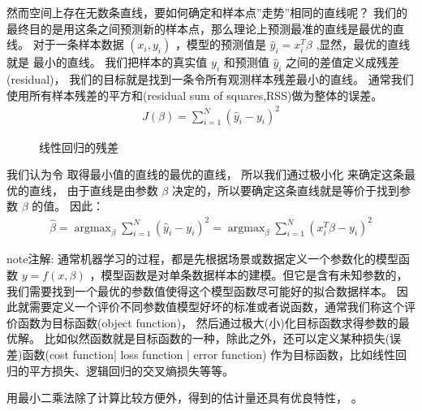 \documentclass[letterpaper,10pt,english]{sphinxmanual}
\begin{document}
然而空间上存在无数条直线，要如何确定和样本点”走势”相同的直线呢？
我们的最终目的是用这条之间预测新的样本点，那么理论上预测最准的直线是最优的直线。
对于一条样本数据 \((x_i,y_i)\) ，模型的预测值是 \(\hat{y}_i = x_i^T \beta\)
,显然，最优的直线就是  最小的直线。
我们把样本的真实值 \(y_i\) 和预测值 \(\hat{y}_i\) 之间的差值定义成残差(residual)，
我们的目标就是找到一条令所有观测样本残差最小的直线。
通常我们使用所有样本残差的平方和(residual sum of squares,RSS)做为整体的误差。
\begin{equation}\label{equation:线性回归/content:线性回归/content:1}
\begin{split}J(\beta)=\sum_{i=1}^N (\hat{y}_i-y_i)^2\end{split}
\end{equation}
\begin{figure}[htbp]
\centering
\capstart

\noindent{}
\caption{线性回归的残差}\label{\detokenize{_u7ebf_u6027_u56de_u5f52/content:id9}}\label{\detokenize{_u7ebf_u6027_u56de_u5f52/content:fg-29-2}}\end{figure}

我们认为令  取得最小值的直线的最优的直线，
所以我们通过极小化  来确定这条最优的直线，
由于直线是由参数 \(\beta\) 决定的，所以要确定这条直线就是等价于找到参数 \(\beta\) 的值。
因此：
\begin{equation}\label{equation:线性回归/content:线性回归/content:2}
\begin{split}\hat{\beta} = \mathop{\arg \max}_{\beta} \sum_{i=1}^N (\hat{y}_i - y_i)^2
=\mathop{\arg \max}_{\beta} \sum_{i=1}^N (x_i^T \beta-y_i)^2\end{split}
\end{equation}
\begin{sphinxadmonition}{note}{注解:}
通常机器学习的过程，都是先根据场景或数据定义一个参数化的模型函数 \(y=f(x,\beta)\)
，模型函数是对单条数据样本的建模。但它是含有未知参数的，
我们需要找到一个最优的参数值使得这个模型函数尽可能好的拟合数据样本。
因此就需要定义一个评价不同参数值模型好坏的标准或者说函数，通常我们称这个评价函数为目标函数(object function)，
然后通过极大(小)化目标函数求得参数的最优解。
比如似然函数就是目标函数的一种，除此之外，还可以定义某种损失(误差)函数(cost function| loss function | error function)
作为目标函数，比如线性回归的平方损失、逻辑回归的交叉熵损失等等。
\end{sphinxadmonition}

用最小二乘法除了计算比较方便外，得到的估计量还具有优良特性， 。
\end{document}
